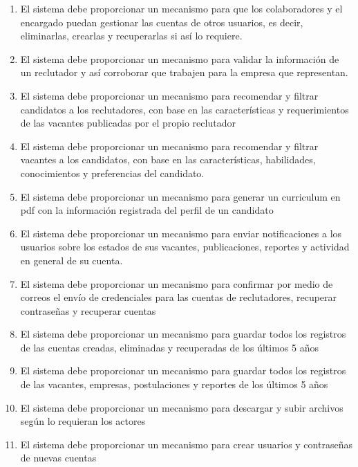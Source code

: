 \begin{enumerate}
        \item El sistema debe proporcionar un mecanismo para que los colaboradores y el encargado puedan gestionar las cuentas de otros usuarios, es decir, eliminarlas, crearlas y recuperarlas si así lo requiere.
        \item El sistema debe proporcionar un mecanismo para validar la información de un reclutador y así corroborar que trabajen para la empresa que representan.
        \item El sistema debe proporcionar un mecanismo para recomendar y filtrar candidatos a los reclutadores, con base en las características y requerimientos de las vacantes publicadas por el propio reclutador  
        \item El sistema debe proporcionar un mecanismo para recomendar y filtrar vacantes a los candidatos, con base en las características, habilidades, conocimientos y preferencias del candidato.
        \item El sistema debe proporcionar un mecanismo para generar un curriculum en pdf con la información registrada del perfil de un candidato
        \item El sistema debe proporcionar un mecanismo para enviar notificaciones a los usuarios sobre los estados de sus vacantes, publicaciones, reportes y actividad en general de su cuenta.
        \item El sistema debe proporcionar un mecanismo para confirmar por medio de correos el envío de credenciales para las cuentas de reclutadores, recuperar contraseñas y recuperar cuentas
        \item El sistema debe proporcionar un mecanismo para guardar todos los registros de las cuentas creadas, eliminadas y recuperadas de los últimos 5 años
        \item El sistema debe proporcionar un mecanismo para guardar todos los registros de las vacantes, empresas, postulaciones y reportes de los últimos 5 años
        \item El sistema debe proporcionar un mecanismo para descargar y subir archivos según lo requieran los actores
        \item El sistema debe proporcionar un mecanismo para crear usuarios y contraseñas de nuevas cuentas

    \end{enumerate} 

